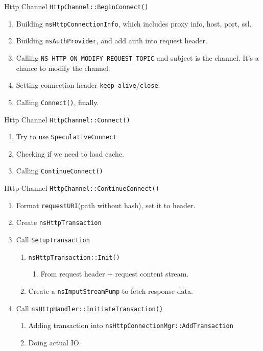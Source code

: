\documentclass{beamer}
\begin{document}
\begin{frame}{Http Channel}
  \texttt{HttpChannel::BeginConnect()}
  \begin{enumerate}
    \item Building \texttt{nsHttpConnectionInfo}, which includes proxy info, host, port, ssl.
    \item Building \texttt{nsAuthProvider}, and add auth into request header.
    \item Calling \texttt{NS\_HTTP\_ON\_MODIFY\_REQUEST\_TOPIC} and subject is the channel. It's a chance to modify the channel.
    \item Setting connection header \texttt{keep-alive}/\texttt{close}.
    \item Calling \texttt{Connect()}, finally.
  \end{enumerate}
\end{frame}

\begin{frame}{Http Channel}
  \texttt{HttpChannel::Connect()}
  \begin{enumerate}
  \item Try to use \texttt{SpeculativeConnect}
  \item Checking if we need to load cache.
  \item Calling \texttt{ContinueConnect()}
  \end{enumerate}
\end{frame}

\begin{frame}{Http Channel}
  \texttt{HttpChannel::ContinueConnect()}
  \begin{enumerate}
  \item Format \texttt{requestURI}(path without hash), set it to header.
  \item Create \texttt{nsHttpTransaction}
  \item Call \texttt{SetupTransaction}
    \begin{enumerate}
    \item \texttt{nsHttpTransaction::Init()}
      \begin{enumerate}
      \item From request header + request content stream.
      \end{enumerate}
    \item Create a \texttt{nsImputStreamPump} to fetch response data.
    \end{enumerate}
  \item Call \texttt{nsHttpHandler::InitiateTransaction()}
    \begin{enumerate}
    \item Adding transaction into \texttt{nsHttpConnectionMgr::AddTransaction}
    \item Doing actual IO.
    \end{enumerate}
  \end{enumerate}
\end{frame}
\end{document}
